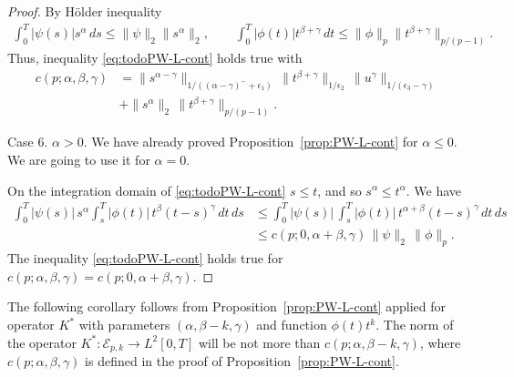 \documentclass{article}
\theoremstyle{plain}
\theoremstyle{remark}
\theoremstyle{definition}
\begin{document}
\begin{proof}
By H\"older inequality
\begin{gather*}
\int_0^T |\psi(s)| s^\alpha \, ds \le
\|\psi\|_2  \|s^\alpha\|_2,
\qquad
\int_0^T |\phi(t)| t^{\beta+\gamma} \, dt \le
\|\phi\|_p  \|t^{\beta+\gamma}\|_{p/(p-1)}.
\end{gather*}
Thus, inequality \eqref{eq:todoPW-L-cont}
holds true with
\begin{align*}
c(p;\alpha,\beta,\gamma)
&=
\|s^{\alpha-\gamma}\|_{1/((\alpha-\gamma)^- + \epsilon_1)} \,
\|t^{\beta+\gamma}\|_{1/\epsilon_2} \,
\|u^\gamma\|_{1/(\epsilon_3-\gamma)}
\\ &+
\|s^\alpha\|_2 \,
\|t^{\beta+\gamma}\|_{p/(p-1)}.
\end{align*}

Case 6.
$\alpha > 0$.
We have already proved Proposition~\ref{prop:PW-L-cont}
for $\alpha\le 0$.  We are going
to use it for $\alpha=0$.

On the integration domain of
\eqref{eq:todoPW-L-cont} $s\le t$,
and so $s^\alpha \le t^\alpha$.
We have
	\begin{align*}
		\int_0^T |\psi(s)|\, s^\alpha
		\int_s^T |\phi(t)|\, t^\beta (t{-}s)^\gamma
		\, dt \, ds &\le
		\int_0^T |\psi(s)|\,
		\int_s^T |\phi(t)|\, t^{\alpha+\beta} (t{-}s)^\gamma
		\, dt \, ds
\\ & \le
		c(p; 0, \alpha{+}\beta, \gamma) \, \|\psi\|_2 \, \|\phi\|_p.
	\end{align*}
The inequality \eqref{eq:todoPW-L-cont}
holds true for
$c(p; \alpha, \beta,\gamma) = c(p; 0, \alpha{+}\beta, \gamma)$.
\end{proof}

The following corollary follows
from Proposition~\ref{prop:PW-L-cont}
applied for operator $K^*$ with parameters
$(\alpha, \beta{-}k, \gamma)$
and function $\phi(t) t^k$.
The norm of the operator $K^* : \mathcal{E}_{p,k} \to L^2[0,T]$
will be not more than $c(p; \alpha, \beta{-}k, \gamma)$,
where $c(p; \alpha, \beta, \gamma)$ is defined
in the proof of Proposition~\ref{prop:PW-L-cont}.
\end{document}
